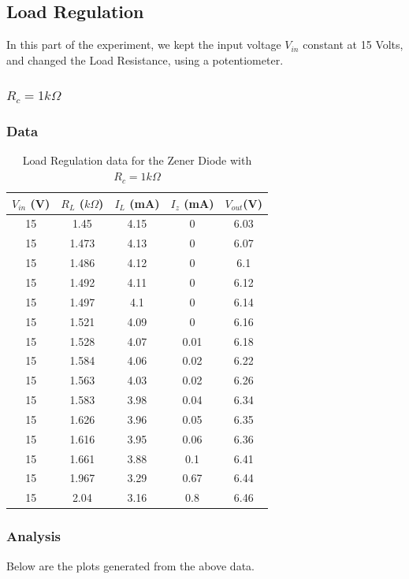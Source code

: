 \documentclass[10pt]{scrartcl}
\theoremstyle{definition}
\begin{document}
\subsection{Load Regulation}
In this part of the experiment, we kept the input voltage $V_{in}$ constant at 15 Volts, and changed the
Load Resistance, using a potentiometer.
\clearpage
\subsubsection*{$R_c = 1 k\Omega$}
\subsubsection{Data}
\begin{table}[!h]
    \centering
    \caption{Load Regulation data for the Zener Diode with $R_c = 1 k\Omega$}
    \begin{tabular}{|c|c|c|c|c|}
    \hline
        \textbf{$V_{in}$ (V)} & \textbf{ $R_L$ ($k\Omega$)} & \textbf{$I_L$ (mA)} & \textbf{$I_z$ (mA)} & \textbf{$V_{out}$(V)} \\ \hline
        15 & 1.45 & 4.15 & 0 & 6.03 \\ \hline
        15 & 1.473 & 4.13 & 0 & 6.07 \\ \hline
        15 & 1.486 & 4.12 & 0 & 6.1 \\ \hline
        15 & 1.492 & 4.11 & 0 & 6.12 \\ \hline
        15 & 1.497 & 4.1 & 0 & 6.14 \\ \hline
        15 & 1.521 & 4.09 & 0 & 6.16 \\ \hline
        15 & 1.528 & 4.07 & 0.01 & 6.18 \\ \hline
        15 & 1.584 & 4.06 & 0.02 & 6.22 \\ \hline
        15 & 1.563 & 4.03 & 0.02 & 6.26 \\ \hline
        15 & 1.583 & 3.98 & 0.04 & 6.34 \\ \hline
        15 & 1.626 & 3.96 & 0.05 & 6.35 \\ \hline
        15 & 1.616 & 3.95 & 0.06 & 6.36 \\ \hline
        15 & 1.661 & 3.88 & 0.1 & 6.41 \\ \hline
        15 & 1.967 & 3.29 & 0.67 & 6.44 \\ \hline
        15 & 2.04 & 3.16 & 0.8 & 6.46 \\ \hline
    \end{tabular}
\end{table}
\subsubsection{Analysis}
Below are the plots generated from the above data.
\end{document}
